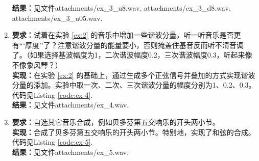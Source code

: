 \documentclass[utf8]{article}
\begin{document}
\begin{enumerate}
        \textbf{结果：}见文件attachments/ex\_3\_u8.wav, attachments/ex\_3\_d8.wav, attachments/ex\_3\_u05.wav.
    \item \label{ex:4}\textbf{要求：}试着在实验 \ref{ex:2} 的音乐中增加一些谐波分量，听一听音乐是否更有```厚度''了？注意谐波分量的能量要小，否则掩盖住基音反而听不清音调了。（如果选择基波幅度为1，二次谐波幅度0.2，三次谐波幅度0.3，听起来像不像象风琴？） \\
        \textbf{实现：}在实验 \ref{ex:2} 的基础上，通过生成多个正弦信号并叠加的方式实现谐波分量的添加。实验中取一次、二次、三次谐波分量的幅度分别为1、0.2、0.3。代码见Listing \ref{code:ex-4}. \\
        \textbf{结果：}见文件attachments/ex\_4.wav.
    \item \label{ex:5}\textbf{要求：}自选其它音乐合成，例如贝多芬第五交响乐的开头两小节。 \\
        \textbf{实现：}合成了贝多芬第五交响乐的开头两小节。特别地，实现了和弦的合成。代码见Listing \ref{code:ex-5}. \\
        \textbf{结果：}见文件attachments/ex\_5.wav.
\end{enumerate}
\end{document}
